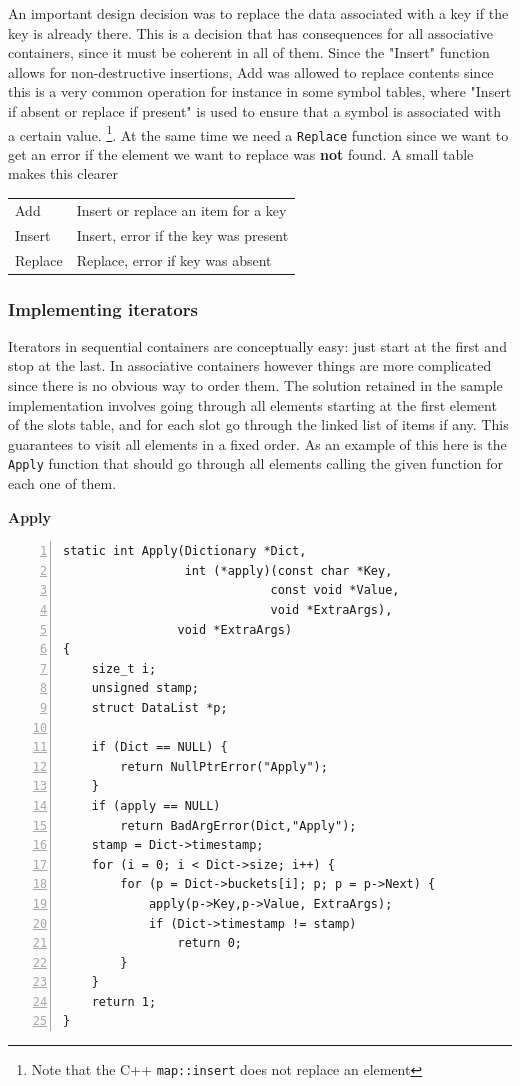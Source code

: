 \documentclass[12pt,a4paper]{memoir} %
\newif\iftth
\newcommand{\container}{}
\newcommand{\function}[1] {%
\vspace{0.2in}
\par\noindent
\textbf{#1}\index{#1!code for \container} \hrulefill
\iftth\else
\nopagebreak
\fi
\noindent\begin{Verbatim}[numbers=left, xleftmargin=7mm]}
\begin{document}
{{An important design decision was to replace the data associated with a key if the key is already there. This is a decision that has consequences for 
all associative containers, since it must be coherent in all of them. Since the "Insert" function allows for non-destructive insertions, Add was
allowed to replace contents since this is a very common operation for instance in some symbol tables, where "Insert if absent or replace if present"
is used to ensure that a symbol is associated with a certain value. \footnote{Note that the C++ \texttt{map::insert} does not replace an element}. At the same time we need a \texttt{Replace} function since we want to get an error if the element we want to replace was \textbf{not} found.
A small table makes this clearer
\par %\vspace{0.5cm}
\begin{center}
\begin{tabular}{|l | l|}
\hline 
Add & Insert or replace an item for a key \\
Insert & Insert, error if the key was present \\
Replace & Replace, error if key was absent \\
\hline
\end{tabular}
\end{center}

\subsubsection{Implementing iterators}
Iterators in sequential containers are conceptually easy: just start at the first and stop at the last. In associative containers however things are 
more complicated since there is no obvious way to order them. The solution retained in the sample implementation involves going through all elements
starting at the first element of the slots table, and for each slot go through the linked list of items if any. This guarantees to visit all elements 
in a fixed order. As an example of this here is the \texttt{Apply} function that should go through all elements calling the given function for each 
one of them.
\function{Apply}
static int Apply(Dictionary *Dict,
                 int (*apply)(const char *Key,
                             const void *Value, 
                             void *ExtraArgs),
                void *ExtraArgs)
{
    size_t i;
    unsigned stamp;
    struct DataList *p;

    if (Dict == NULL) {
        return NullPtrError("Apply");
    }
    if (apply == NULL)
        return BadArgError(Dict,"Apply");
    stamp = Dict->timestamp;
    for (i = 0; i < Dict->size; i++) {
        for (p = Dict->buckets[i]; p; p = p->Next) {
            apply(p->Key,p->Value, ExtraArgs);
            if (Dict->timestamp != stamp)
                return 0;
        }
    }
    return 1;
}
\end{Verbatim}

}}
\end{document}
